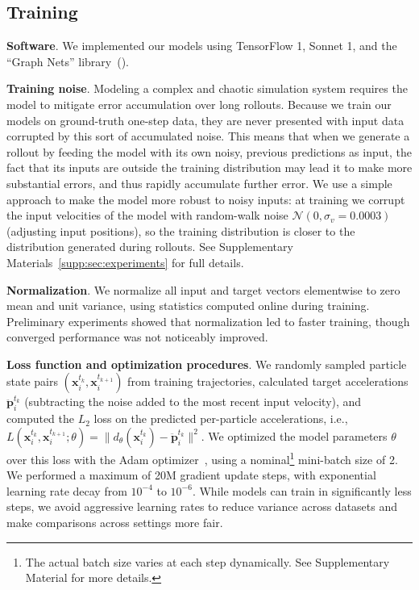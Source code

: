\documentclass{article}
\newcommand{\xhdr}[1]{{\noindent\bfseries #1}.}
\newcommand{\norm}[1]{\lVert#1\rVert}
\begin{document}
\subsection{Training}
\label{sec:experiment:training}

%
\xhdr{Software} We implemented our models using TensorFlow 1, Sonnet 1, and the ``Graph Nets'' library~(\citeyear{graphnetlib}).

\xhdr{Training noise}
Modeling a complex and chaotic simulation system requires the model to mitigate error accumulation over long rollouts. Because we train our models on ground-truth one-step data, they are never presented with input data %
corrupted by this sort of accumulated noise.
This means that when we generate a rollout by feeding the model with its own noisy, previous predictions as input, the fact that its inputs are outside the training distribution may lead it to make more substantial errors, and thus rapidly accumulate further error.
%
We use a simple approach to make the model more robust to noisy inputs: at training we corrupt the input velocities of the model with random-walk noise $\mathcal{N}(0, \sigma_v=0.0003)$ (adjusting input positions), so the training distribution is closer to the distribution generated during rollouts. See Supplementary Materials~\ref{supp:sec:experiments} for full details.


\xhdr{Normalization}
We normalize all input and target vectors elementwise to zero mean and unit variance, using statistics computed online during training.
%
Preliminary experiments showed that normalization led to faster training, though converged performance was not noticeably improved.



\xhdr{Loss function and optimization procedures}
%
We randomly sampled particle state pairs $(\mathbf{x}^{t_k}_i, \mathbf{x}^{t_{k+1}}_i)$ from training trajectories, calculated target accelerations $\ddot{\mathbf{p}}^{t_{k}}_i$ (subtracting the noise added to the most recent input velocity), and computed the $L_2$ loss on the predicted per-particle accelerations, i.e., $L(\mathbf{x}^{t_k}_i, \mathbf{x}^{t_{k+1}}_i; \theta) = \norm{ d_{\theta}(\mathbf{x}^{t_{k}}_i) - \ddot{\mathbf{p}}^{t_{k}}_i}^2$.
%
We optimized the model parameters $\theta$ over this loss with the Adam optimizer~\cite{kingma2014adam}, using a nominal\footnote{The actual batch size varies at each step dynamically. See Supplementary Material for more details.} mini-batch size of 2. We performed a maximum of 20M gradient update steps, with exponential learning rate decay from $10^{-4}$ to $10^{-6}$.
%
While models can train in significantly less steps, we avoid aggressive learning rates to reduce variance across datasets and make comparisons across settings more fair.
\end{document}
